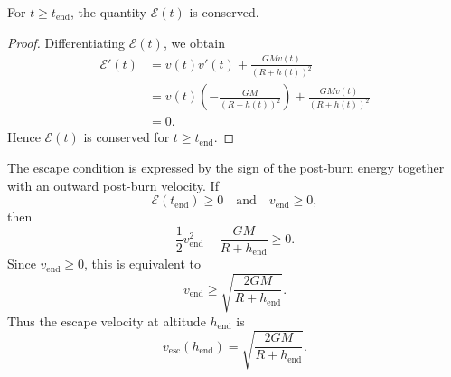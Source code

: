 ﻿\documentclass[12pt]{article}
\begin{document}
\begin{lemma}
For $t\ge t_{\mathrm{end}}$, the quantity $\mathcal E(t)$ is conserved.
\end{lemma}

\begin{proof}
Differentiating $\mathcal E(t)$, we obtain
\[
\begin{aligned}
 \mathcal E'(t)
 & =
 v(t)v'(t) + \frac{GMv(t)}{(R + h(t))^2}\\
 & =
 v(t)\left(-\frac{GM}{(R + h(t))^2}\right)
 +
 \frac{GMv(t)}{(R + h(t))^2}\\
 & = 0.
\end{aligned}
\]
Hence $\mathcal E(t)$ is conserved for $t\ge t_{\mathrm{end}}$.
\end{proof}
The escape condition is expressed by the sign of the post-burn energy together with an outward post-burn velocity.
If
\[
 \mathcal E(t_{\mathrm{end}})\ge0
 \quad\text{and}\quad
 v_{\mathrm{end}}\ge0,
\]
then
\[
 \frac{1}{2}v_{\mathrm{end}}^2 - \frac{GM}{R + h_{\mathrm{end}}}\ge0.
\]
Since $v_{\mathrm{end}}\ge0$, this is equivalent to
\[
 v_{\mathrm{end}}\ge \sqrt{\frac{2GM}{R + h_{\mathrm{end}}}}.
\]
Thus the escape velocity at altitude $h_{\mathrm{end}}$ is
\[
 \boxed{
 v_{\mathrm{esc}}(h_{\mathrm{end}})
 =
 \sqrt{\frac{2GM}{R + h_{\mathrm{end}}}}.
 }
\]
\end{document}
